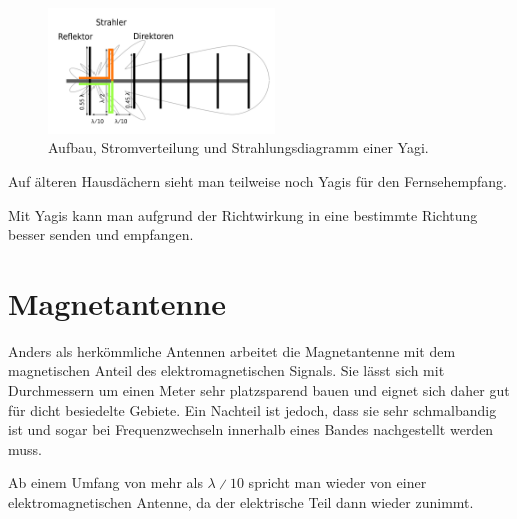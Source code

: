 \begin{figure}[h!]
 \centering
 \includegraphics[width=6cm]{./png/Amfu-Yagi.png}
 \caption{Aufbau, Stromverteilung und Strahlungsdiagramm einer Yagi.}
 \label{fig:yagi}
\end{figure}

Auf älteren Hausdächern sieht man teilweise noch Yagis für den Fernsehempfang.

Mit Yagis kann man aufgrund der Richtwirkung in eine bestimmte Richtung besser senden und empfangen. 

\section{Magnetantenne}
Anders als herkömmliche Antennen arbeitet die Magnetantenne mit dem magnetischen Anteil des elektromagnetischen Signals. Sie lässt sich mit Durchmessern um einen Meter sehr platzsparend bauen und eignet sich daher gut für dicht besiedelte Gebiete. Ein Nachteil ist jedoch, dass sie sehr schmalbandig ist und sogar bei Frequenzwechseln innerhalb eines Bandes nachgestellt werden muss.

Ab einem Umfang von mehr als $\lambda∕10$ spricht man wieder von einer elektromagnetischen Antenne, da der elektrische Teil dann wieder zunimmt.



